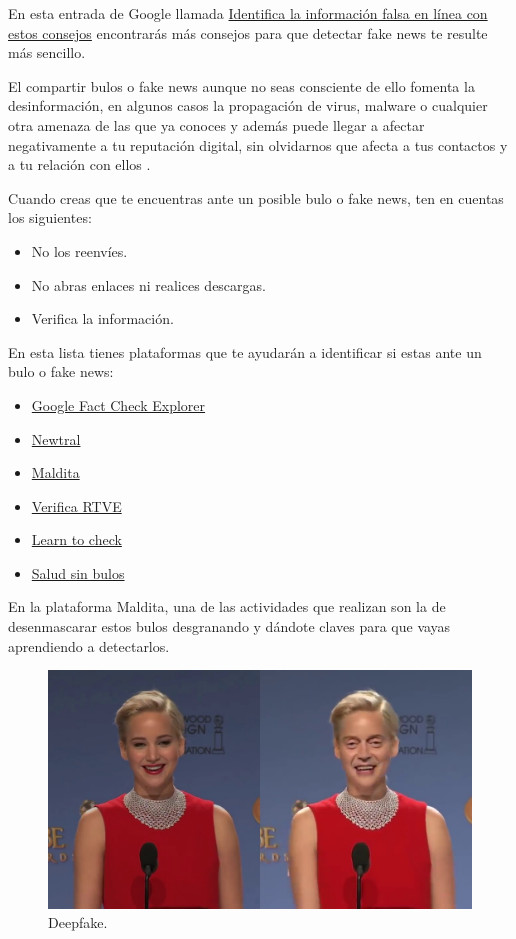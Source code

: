\documentclass[
  a4paper,
  openany]{book}
\begin{document}
En esta entrada de Google llamada \href{https://blog.google/products/news/consejos-verificacion-hechos/}{Identifica la información falsa en línea con estos consejos} encontrarás más consejos para que detectar fake news te resulte más sencillo.

El compartir bulos o fake news aunque no seas consciente de ello fomenta la desinformación, en algunos casos la propagación de virus, malware o cualquier otra amenaza de las que ya conoces y además puede llegar a afectar negativamente a tu reputación digital, sin olvidarnos que afecta a tus contactos y a tu relación con ellos \citep{OSI-frena-evita-bulos}.

Cuando creas que te encuentras ante un posible bulo o fake news, ten en cuentas los siguientes:

\begin{itemize}
\item
  No los reenvíes.
\item
  No abras enlaces ni realices descargas.
\item
  Verifica la información.
\end{itemize}

En esta lista tienes plataformas que te ayudarán a identificar si estas ante un bulo o fake news:

\begin{itemize}
\item
  \href{https://toolbox.google.com/factcheck/explorer}{Google Fact Check Explorer}
\item
  \href{https://www.newtral.es/zona-verificacion/fact-check/}{Newtral}
\item
  \href{https://maldita.es/malditobulo/1}{Maldita}
\item
  \href{https://www.rtve.es/noticias/verificartve/}{Verifica RTVE}
\item
  \href{https://learntocheck.org/}{Learn to check}
\item
  \href{https://saludsinbulos.com/}{Salud sin bulos}
\end{itemize}

En la plataforma Maldita, una de las actividades que realizan son la de desenmascarar estos bulos desgranando y dándote claves para que vayas aprendiendo a detectarlos.

\begin{figure}

{\centering \includegraphics[width=0.75\linewidth]{images/deepfake} 

}

\caption{Deepfake.}\label{fig:unnamed-chunk-21}
\end{figure}
\end{document}
